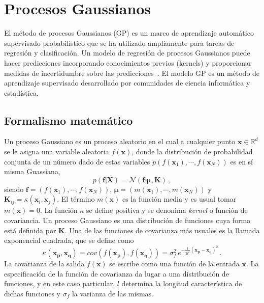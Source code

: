 \chapter{Procesos Gaussianos}
\label{app:gp}

El método de procesos Gaussianos (GP) es un marco de aprendizaje 
automático supervisado probabilístico que se ha utilizado ampliamente 
para tareas de regresión y clasificación. Un modelo de regresión de 
procesos Gaussianos puede hacer predicciones incorporando conocimientos 
previos (kernels) y proporcionar medidas de incertidumbre sobre las 
predicciones~\cite{Rasmussen:06}. El modelo GP es un método de 
aprendizaje supervisado desarrollado por comunidades de ciencia 
informática y estadística. 

\section*{Formalismo matemático}

Un proceso Gaussiano es un proceso aleatorio en el cual a cualquier 
punto $\mathbf{x}\in \mathbb{R}^d$ se le asigna una variable aleatoria 
$f(\mathbf{x})$, donde la distribución de probabilidad conjunta de un 
número dado de estas variables 
$p(f(\mathbf{x}_1),\cdots,f(\mathbf{x}_N))$ es en sí misma Guassiana,
\begin{equation}
p(\mathbf{f}|\mathbf{X})
=\mathcal{N}(\mathbf{f}|\boldsymbol{\mu},\mathbf{K})\,,
\end{equation}
siendo $\mathbf{f}=(f(\mathbf{x}_1),\cdots,f(\mathbf{x}_N))$, 
$\boldsymbol\mu=(m(\mathbf{x}_1),\cdots,m(\mathbf{x}_N))$ y 
$\mathbf{K}_{ij}=\kappa(\mathbf{x}_i,\mathbf{x}_j)$. El término 
$m(\mathbf{x})$ es la función media y es usual tomar $m(\mathbf{x})=0$.
La función $\kappa$ se define positiva y se denonima \textit{kernel}
o función de covariancia. Un proceso Gaussiano es una distribución de 
funciones cuya forma está definida por $\mathbf{K}$. Una de las 
funciones de covarianza más usuales es la llamada exponencial
cuadrada, que se define como
\begin{equation}
\kappa(\mathbf{x}_{\mathbf{p}},\mathbf{x}_{\mathbf{q}})
=cov(f(\mathbf{x}_{\mathbf{p}}),f(\mathbf{x}_{\mathbf{q}}))
=\sigma_f^2\,e^{-\frac{1}{2l^2}(\mathbf{x}_{\mathbf{p}}
-\mathbf{x}_{\mathbf{q}})^2}\,.
\end{equation}
La covarianza de la salida $f(\mathbf{x})$ se escribe como una función 
de la entrada $\mathbf{x}$. La especificación de la función de 
covarianza da lugar a una distribución de funciones, y en este caso 
particular, $l$ determina la longitud característica de dichas funciones
y $\sigma_f$ la varianza de las mismas. 

